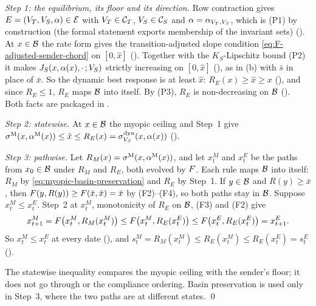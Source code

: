 \emph{Step 1: the equilibrium, its floor and its direction.} Row contraction
gives $E=(V_T,V_S,\alpha)\in\mathcal E$ with $V_T\in\mathcal C_T$,
$V_S\in\mathcal C_S$ and $\alpha=\alpha_{V_T,V_S}$, which is (P1) by construction
(the formal statement exports membership of the invariant sets)
(). At
$x\in\mathcal{B}$ the rate form gives the transition-adjusted slope condition
\eqref{eq:F-adjusted-sender-chord} on $[0,\hat x]$
(). Together
with the $K_S$-Lipschitz bound (P2) it makes $J_S(x,\alpha(x),\cdot\,;V_S)$
strictly increasing on $[0,\hat x]$
(),
as in (b) with $\bar s$ in place of $\bar x$. So the dynamic best response
is at least $\hat x$: $R_E(x)\ge\hat x\ge x$
(), and since $R_E\le1$, $R_E$ maps
$\mathcal{B}$ into itself. By (P3), $R_E$ is non-decreasing on $\mathcal{B}$
(). Both facts are packaged in
.

\emph{Step 2: statewise.} At $x\in\mathcal{B}$ the myopic ceiling and Step~1 give
$\sigma^{\mathrm{M}}(x,\alpha^{\mathrm{M}}(x))\le\hat x\le R_E(x)=\sigma^{\mathrm{dyn}}_{V_S}(x,\alpha(x))$
().

\emph{Step 3: pathwise.} Let $R_M(x)=\sigma^{\mathrm{M}}(x,\alpha^{\mathrm{M}}(x))$, and let $x^M_t$ and
$x^E_t$ be the paths from $x_0\in\mathcal{B}$ under $R_M$ and $R_E$, both evolved by
$F$. Each rule maps $\mathcal{B}$ into itself: $R_M$ by
\eqref{eq:myopic-basin-preservation} and $R_E$ by Step~1. If $y\in\mathcal{B}$ and
$R(y)\ge\bar x$, then $F(y,R(y))\ge F(\bar x,\bar x)=\bar x$ by (F2)--(F4),
so both paths stay in $\mathcal{B}$. Suppose $x^M_t\le x^E_t$. Step~2 at $x^M_t$,
monotonicity of $R_E$ on $\mathcal{B}$, (F3) and (F2) give
\[
x^M_{t+1}=F\bigl(x^M_t,R_M(x^M_t)\bigr)\le F\bigl(x^M_t,R_E(x^E_t)\bigr)
\le F\bigl(x^E_t,R_E(x^E_t)\bigr)=x^E_{t+1}.
\]
So $x^M_t\le x^E_t$ at every date
(), and
$s^M_t=R_M(x^M_t)\le R_E(x^M_t)\le R_E(x^E_t)=s^E_t$
().

The statewise inequality compares the myopic ceiling with the sender's floor;
it does not go through  or the compliance ordering. Basin
preservation is used only in Step~3, where the two paths are at different
states. \qed

